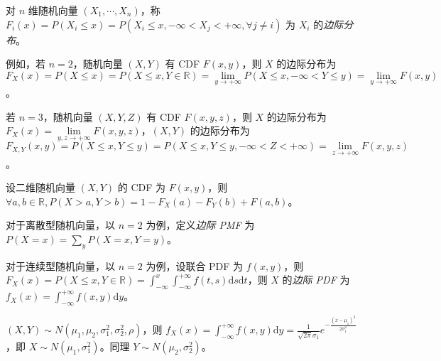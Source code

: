 \documentclass[../main.tex]{subfiles}
\begin{document}
对 $n$ 维随机向量 $(X_1,\cdots,X_n)$，称 $F_i(x)=P(X_i\leq x)=P(X_i\leq x,-\infty<X_j<+\infty,\forall j\neq i)$ 为 $X_i$ 的\emph{边际分布}。

例如，若 $n=2$，随机向量 $(X,Y)$ 有 CDF $F(x,y)$，则 $X$ 的边际分布为 $F_X(x)=P(X\leq x)=P(X\leq x,Y\in\mathbb R)=\lim\limits_{y\rightarrow+\infty}P(X\leq x,-\infty<Y\leq y)=\lim\limits_{y\rightarrow+\infty}F(x,y)$。

若 $n=3$，随机向量 $(X,Y,Z)$ 有 CDF $F(x,y,z)$，则 $X$ 的边际分布为 $F_X(x)=\lim\limits_{y,z\rightarrow+\infty}F(x,y,z)$，$(X,Y)$ 的边际分布为 $F_{X,Y}(x,y)=P(X\leq x,Y\leq y)=P(X\leq x,Y\leq y,-\infty<Z<+\infty)=\lim\limits_{z\rightarrow+\infty}F(x,y,z)$。

\begin{example}
设二维随机向量 $(X,Y)$ 的 CDF 为 $F(x,y)$，则 $\forall a,b\in\mathbb R,P(X>a,Y>b)=1-F_X(a)-F_Y(b)+F(a,b)$。
\end{example}

对于离散型随机向量，以 $n=2$ 为例，定义\emph{边际 PMF} 为 $P(X=x)=\sum\limits_y{P(X=x,Y=y)}$。

对于连续型随机向量，以 $n=2$ 为例，设联合 PDF 为 $f(x,y)$，则 $F_X(x)=P(X\leq x,Y\in\mathbb R)=\int_{-\infty}^x\int_{-\infty}^{+\infty}f(t,s)\mathrm ds\mathrm dt$，则 $X$ 的\emph{边际 PDF} 为 $f_X(x)=\int_{-\infty}^{+\infty}f(x,y)\mathrm dy$。

\begin{example}
$(X,Y)\sim N(\mu_1,\mu_2,\sigma_1^2,\sigma_2^2,\rho)$，则 $f_X(x)=\int_{-\infty}^{+\infty}f(x,y)\mathrm dy=\frac1{\sqrt{2\pi}\sigma_1}e^{-\frac{(x-\mu_1)^2}{2\sigma_1^2}}$，即 $X\sim N(\mu_1,\sigma_1^2)$。同理 $Y\sim N(\mu_2,\sigma_2^2)$。
\end{example}
\end{document}
